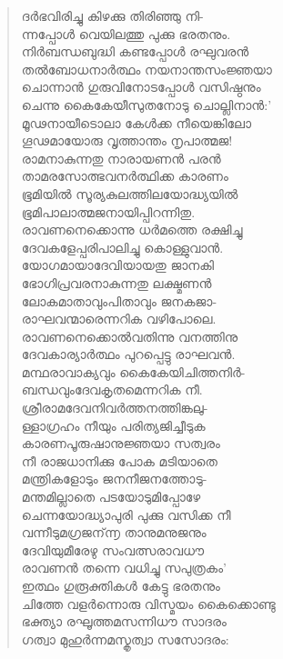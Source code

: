 \begin{verse}
ദര്‍ഭവിരിച്ചു കിഴക്കു തിരിഞ്ഞു നി-\\
ന്നപ്പോള്‍ വെയിലത്തു പുക്കു ഭരതനും.\\
നിര്‍ബന്ധബുദ്ധി കണ്ടപ്പോള്‍ രഘുവരന്‍\\
തല്‍ബോധനാര്‍ത്ഥം നയനാന്തസംജ്ഞയാ\\
ചൊന്നാന്‍ ഗുരുവിനോടപ്പോള്‍ വസിഷ്ഠനും\\
ചെന്നു കൈകേയീസുതനോടു ചൊല്ലിനാന്‍:’\\
മൂഢനായീടൊലാ കേള്‍ക്ക നീയെങ്കിലോ\\
ഗൂഢമായോരു വൃത്താന്തം നൃപാത്മജ!\\
രാമനാകുന്നതു നാരായണന്‍ പരന്‍\\
താമരസോത്ഭവനര്‍ത്ഥിക്ക കാരണം\\
ഭൂമിയില്‍ സൂര്യകുലത്തിലയോദ്ധ്യയില്‍\\
ഭൂമിപാലാത്മജനായിപ്പിറന്നിതു.\\
രാവണനെക്കൊന്നു ധര്‍മത്തെ രക്ഷിച്ചു\\
ദേവകളേപ്പരിപാലിച്ചു കൊള്ളുവാന്‍.\\
യോഗമായാദേവിയായതു ജാനകി\\
ഭോഗിപ്രവരനാകുന്നതു ലക്ഷ്മണന്‍\\
ലോകമാതാവുംപിതാവും ജനകജാ-\\
രാഘവന്മാരെന്നറിക വഴിപോലെ.\\
രാവണനെക്കൊല്‍വതിന്നു വനത്തിനു\\
ദേവകാര്യാര്‍ത്ഥം പുറപ്പെട്ടു രാഘവന്‍.\\
മന്ഥരാവാക്യവും കൈകേയിചിത്തനിര്‍-\\
ബന്ധവുംദേവകൃതമെന്നറിക നീ.\\
ശ്രീരാമദേവനിവര്‍ത്തനത്തിങ്കലു-\\
ള്ളാഗ്രഹം നീയും പരിത്യജിച്ചീടുക\\
കാരണപൂരുഷാനുജ്ഞയാ സത്വരം\\
നീ രാജധാനിക്കു പോക മടിയാതെ\\
മന്ത്രികളോടും ജനനീജനത്തോടു-\\
മന്തമില്ലാതെ പടയോടുമിപ്പോഴേ\\
ചെന്നയോദ്ധ്യാപുരി പുക്കു വസിക്ക നീ\\
വന്നീടുമഗ്രജന്൬ താനുമനുജനും\\
ദേവിയുമീരേഴു സംവത്സരാവധൗ\\
രാവണന്‍ തന്നെ വധിച്ചു സപുത്രകം’\\
ഇത്ഥം ഗുരൂക്തികള്‍ കേട്ടു ഭരതനും\\
ചിത്തേ വളര്‍ന്നൊരു വിസ്മയം കൈക്കൊണ്ടു\\
ഭക്ത്യാ രഘൂത്തമസന്നിധൗ സാദരം\\
ഗത്വാ മുഹുര്‍ന്നമസ്കൃത്വാ സസോദരം:\\

\end{verse}
